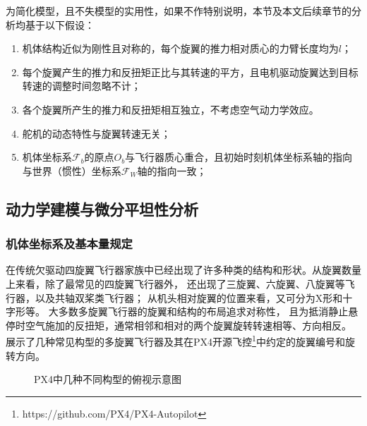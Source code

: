 为简化模型，且不失模型的实用性，如果不作特别说明，本节及本文后续章节的分析均基于以下假设：
\begin{enumerate}
    \renewcommand{\labelenumi}{(\theenumi)}
    \item 机体结构近似为刚性且对称的，每个旋翼的推力相对质心的力臂长度均为$l$；
    \item 每个旋翼产生的推力和反扭矩正比与其转速的平方，且电机驱动旋翼达到目标转速的调整时间忽略不计；
    \item 各个旋翼所产生的推力和反扭矩相互独立，不考虑空气动力学效应。
    \item 舵机的动态特性与旋翼转速无关；
    \item 机体坐标系$\mathscr{F}_b$的原点$O_b$与飞行器质心重合，且初始时刻机体坐标系轴的指向与世界（惯性）坐标系$\mathscr{F}_W$轴的指向一致；
\end{enumerate}

\subsection{动力学建模与微分平坦性分析}\label{subsec:dynamic_analysis}
\subsubsection{机体坐标系及基本量规定}\label{subsubsec:basic_definition}
在传统欠驱动四旋翼飞行器家族中已经出现了许多种类的结构和形状。从旋翼数量上来看，除了最常见的四旋翼飞行器外，
还出现了三旋翼、六旋翼、八旋翼等飞行器，以及共轴双桨类飞行器；
从机头相对旋翼的位置来看，又可分为X形和十字形等。
大多数多旋翼飞行器的旋翼和结构的布局追求对称性，
且为抵消静止悬停时空气施加的反扭矩，通常相邻和相对的两个旋翼旋转转速相等、方向相反。
展示了几种常见构型的多旋翼飞行器及其在PX4开源飞控\footnote{https://github.com/PX4/PX4-Autopilot}中约定的旋翼编号和旋转方向。
\begin{figure}[!ht]
    \setlength{\subfigcapskip}{-1bp}
    \centering
    \begin{minipage}{\textwidth}
    \centering
    \subfigure{\label{fig:quadrotor_x}}\addtocounter{subfigure}{-2}
    \hspace{0.2em}
    \subfigure{\label{fig:quadrotor_plus}}\addtocounter{subfigure}{-2}
    \hspace{0.2em}
    \subfigure{\label{fig:hexarotor_x}}\addtocounter{subfigure}{-2}
    \hspace{0.2em}
    \subfigure{\label{fig:hexarotor_plus}}\addtocounter{subfigure}{-2}
    \end{minipage}
    \caption{PX4中几种不同构型的俯视示意图\label{fig:airframe_reference}}
\end{figure}

